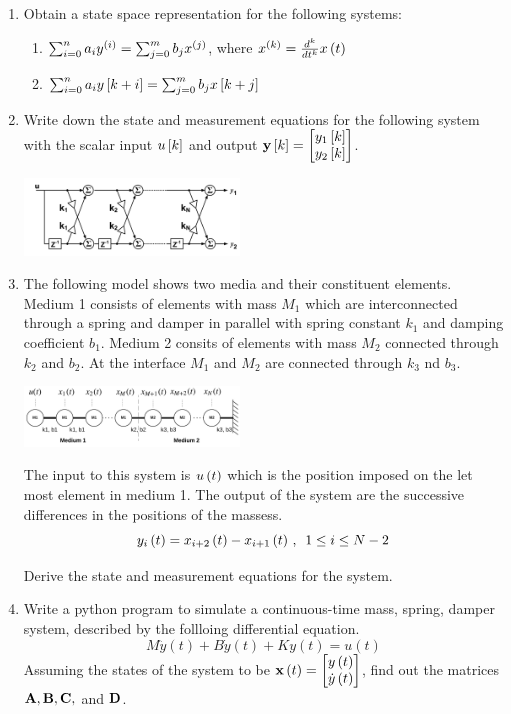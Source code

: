 \documentclass[9pt]{article}
\def\mf{\ensuremath\mathbf}
\def\lp{\ensuremath\left(}
\def\rp{\ensuremath\right)}
\def\ls{\ensuremath\left[}
\def\rs{\ensuremath\right]}
\def\bmx{\ensuremath\begin{bmatrix*}[r]}
\def\emx{\ensuremath\end{bmatrix*}}
\newcommand{\ct}[1]{\lp #1\rp}
\newcommand{\dt}[1]{\ls #1\rs}
\begin{document}
\begin{multicols}{2}
\begin{enumerate}[resume]
    \item Obtain a state space representation for the following systems:
    \begin{enumerate}
        \item $\sum_{i=0}^n a_iy^{\ct{i}} = \sum_{j=0}^m b_jx^{\ct{j}}$, where $x^{\ct{k}} = \frac{d^k}{dt^k}x\ct{t}$
        \item $\sum_{i=0}^n a_iy\dt{k+i} = \sum_{j=0}^m b_jx\dt{k+j}$
    \end{enumerate}
    

    \item Write down the state and measurement equations for the following system with the scalar input $u\dt{k}$ and output $\mf{y}\dt{k} = \bmx y_1\dt{k}\\ y_2\dt{k}\emx$. 

    \includegraphics[width=0.45\textwidth]{../figs/latticefilt.png}

    \item The following model shows two media and their constituent elements. Medium 1 consists of elements with mass $M_1$ which are interconnected through a spring and damper in parallel with spring constant $k_1$ and damping coefficient $b_1$. Medium 2 consits of elements with mass $M_2$ connected through $k_2$ and $b_2$. At the interface $M_1$ and $M_2$ are connected through $k_3$ nd $b_3$.

    \includegraphics[width=0.45\textwidth]{../figs/wavetx.png}    

    The input to this system is $u\ct{t}$ which is the position imposed on the let most element in medium 1. The output of the system are the successive differences in the positions of the massess.
    \[ y_i\ct{t} = x_{i+2}\ct{t} - x_{i+1}\ct{t} \, ,\,\,\, 1 \leq i \leq N-2 \]

    Derive the state and measurement equations for the system.

    \item Write a python program to simulate a continuous-time mass, spring, damper system, described by the follloing differential equation.
    \[ M \ddot{y}(t) + B\dot{y}(t) + K y(t) = u(t) \]
    Assuming the states of the system to be $\mf{x}\lp t \rp = \bmx y\lp t \rp \\ \dot{y}\lp t \rp \emx$, find out the matrices $\mf{A}, \mf{B}, \mf{C}, $ and $\mf{D}$.


\end{enumerate}
\end{multicols}
\end{document}
